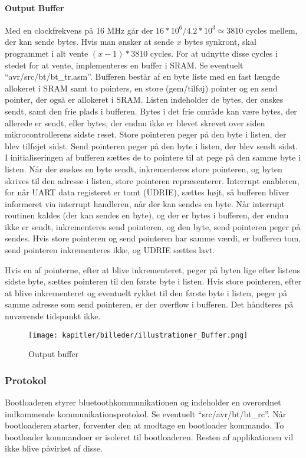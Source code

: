 \paragraph{Output Buffer}
\label{sec:buffer}
Med en clockfrekvens på 16 MHz går der $16*10^6 / 4.2*10^3 \simeq 3810$ cycles mellem, der kan sende bytes. Hvis man ønsker at sende $x$ bytes synkront, skal programmet i alt vente $(x-1)*3810$ cycles. For at udnytte disse cycles i stedet for at vente, implementeres en buffer i SRAM.
Se eventuelt \mbox{``avr/src/bt/bt\_tr.asm''}.
Bufferen består af en byte liste med en fast længde allokeret i SRAM samt to pointers, en store (gem/tilføj) pointer og en send pointer, der også er allokeret i SRAM. Listen indeholder de bytes, der ønskes sendt, samt den frie plads i bufferen. Bytes i det frie område kan være bytes, der allerede er sendt, eller bytes, der endnu ikke er blevet skrevet over siden mikrocontrollerens sidste reset. Store pointeren peger på den byte i listen, der blev tilføjet sidst. Send pointeren peger på den byte i listen, der blev sendt sidst.
I initialiseringen af bufferen sættes de to pointere til at pege på den samme byte i listen.
Når der ønskes en byte sendt, inkrementeres store pointeren, og byten skrives til den adresse i listen, store pointeren repræsenterer. Interrupt enableren, for når UART data registeret er tomt (UDRIE), sættes højt, så bufferen bliver informeret via interrupt handleren, når der kan sendes en byte.
Når interrupt routinen kaldes (der kan sendes en byte), og der er bytes i bufferen, der endnu ikke er sendt, inkrementeres send pointeren, og den byte, send pointeren peger på sendes. Hvis store pointeren og send pointeren har samme værdi, er bufferen tom, send pointeren inkrementeres ikke, og UDRIE sættes lavt.

Hvis en af pointerne, efter at blive inkrementeret, peger på byten lige efter listens sidste byte, sættes pointeren til den første byte i listen.
Hvis store pointeren, efter at blive inkrementeret og eventuelt rykket til den første byte i listen, peger på samme adresse som send pointeren, er der overflow i bufferen. Det håndteres på nuværende tidspunkt ikke.

\begin{figure}[ht]
    \centering
    \texttt{[image: kapitler/billeder/illustrationer\_Buffer.png]}
    \caption{Output buffer}
    \label{fig:buffer}
\end{figure}

\subsubsection{Protokol}
Bootloaderen styrer bluetoothkommunikationen og indeholder en overordnet indkommende kommunikationsprotokol.
Se eventuelt \mbox{``src/avr/bt/bt\_rc''}.
Når bootloaderen starter, forventer den at modtage en bootloader kommando.
To bootloader kommandoer er isoleret til bootloaderen. Resten af applikationen vil ikke blive påvirket af disse.

